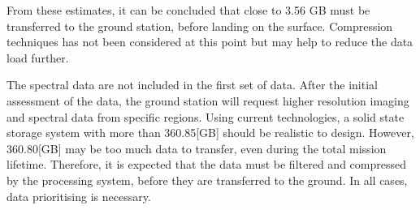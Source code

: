 \begin{table}[htb!]
  \centering
\caption{The total storage required from the storage system.}
  \label{tab:data_rate_storage_requirements_final_5}%
\end{table}%

From these estimates, it can be concluded that close to 3.56 GB must be transferred to the ground station, before landing on the surface. Compression techniques has not been considered at this point but may help to reduce the data load further. 

The spectral data are not included in the first set of data. After the initial assessment of the data, the ground station will request higher resolution imaging and spectral data from specific regions. Using current technologies, a solid state storage system with more than 360.85[GB] should be realistic to design. However, 360.80[GB] may be too much data to transfer, even during the total mission lifetime. Therefore, it is expected that the data must be filtered and compressed by the processing system, before they are transferred to the ground. In all cases, data prioritising is necessary.
\newpage
